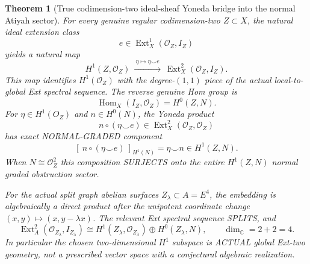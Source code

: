 \documentclass[11pt,a4paper]{article}
\newtheorem{theorem}{Theorem}[section]
\begin{document}
\begin{theorem}[True codimension-two ideal-sheaf Yoneda bridge into the normal Atiyah sector]
For every genuine regular
codimension-two \(Z\subset X\),
the natural ideal extension
class
\[
 e\in\operatorname{Ext}^1_X
      (\mathcal O_Z,I_Z)
\]
yields a natural map
\[
 \boxed{
 H^1(Z,\mathcal O_Z)
 \ \xrightarrow{\ \eta\mapsto\eta\smile e\ }\
 \operatorname{Ext}^2_X(\mathcal O_Z,I_Z).
 }                                                       \tag{8.2}
\]
This map identifies
\(H^1(\mathcal O_Z)\)
with the degree-\((1,1)\)
piece of the actual
local-to-global
Ext spectral sequence.
The reverse genuine
Hom group is
\[
 \boxed{\operatorname{Hom}_X(I_Z,\mathcal O_Z)
              =H^0(Z,N).}                        \tag{8.3}
\]
For \(\eta\in H^1(O_Z)\)
and \(n\in H^0(N)\),
the Yoneda product
\[
  n\circ(\eta\smile e)
        \in\operatorname{Ext}^2_X
                     (\mathcal O_Z,\mathcal O_Z)
\]
has exact NORMAL-GRADED
component
\[
 \boxed{[\ n\circ(\eta\smile e)\ ]_{H^1(N)}
        =\eta\smile n\in H^1(Z,N).}                \tag{8.4}
\]
When \(N\cong\mathcal O_Z^2\)
this composition SURJECTS
onto the entire
\(H^1(Z,N)\) normal
graded obstruction sector.

For the actual split graph
abelian surfaces
\(Z_\lambda\subset A=E^4\),
the embedding is
algebraically a direct
product after the
unipotent coordinate
change
\((x,y)\mapsto(x,y-\lambda x)\).
The relevant Ext spectral
sequence SPLITS, and
\[
 \boxed{
 \operatorname{Ext}^2_A
    (\mathcal O_{Z_\lambda},I_{Z_\lambda})
  \cong H^1(Z_\lambda,\mathcal O_{Z_\lambda})
          \oplus H^0(Z_\lambda,N),
 \qquad\dim_{\mathbb C}=2+2=4 .}                  \tag{8.5}
\]
In particular the chosen
two-dimensional \(H^1\)
subspace is ACTUAL
global Ext-two geometry,
not a prescribed vector
space with a conjectural
algebraic realization.
\end{theorem}
\end{document}
